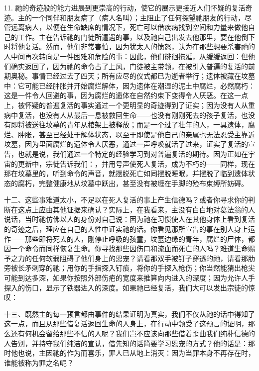 11. 祂的奇迹般的能力进展到更崇高的行动，使它的展示更接近人们怀疑的复活奇迹。主的一个同伴和朋友病了（病人名叫）；主阻止了任何探望祂朋友的行动，尽管远离病人，以便在生命缺席的情况下，死亡可以借疾病找到空间和力量来做他自己的工作。主在告诉祂的门徒所遭遇的事，以及祂自己出发去他那里，要在他倒下时将他复活。然而，他们非常害怕，因为犹太人的愤怒，认为在那些想要杀害祂的人中间再次转向是一件困难和危险的事：因此，他们徘徊拖延，从缓缓返回：但他们确实返回了，因为祂的命令占了上风，门徒被主带领，在被引入普遍的复活的前期奥秘。事情已经过去了四天；所有应尽的仪式都已为逝者举行；遗体被藏在坟墓中：它可能已经肿胀并开始腐烂解体，因为遗体在潮湿的泥土中腐烂，必然腐朽：这是一件令人回避的事，因为腐烂的遗体在自然约束下变得令人厌恶。在这一点上，被怀疑的普遍复活的事实通过一个更明显的奇迹得到了证实；因为没有人从重病中复活，也没有人从最后一息被救回生命——也没有刚刚死去的孩子复活，也没有即将被送往坟墓的青年从棺架上被释放；而是一个过了壮年的人，一具遗体，腐烂、肿胀，甚至已经处于解体状态，以至于即使是他自己的亲属也无法忍受主靠近坟墓，因为里面腐烂的遗体令人厌恶，通过一声呼唤就活了过来，证实了复活的宣告，也就是说，我们通过一个特定的经验学习到对普遍复活的期待。因为正如在宇宙的更新中，宗徒告诉我们：，并用号声使死人复活，成为不朽的——同样，现在那在坟墓里的，听到命令的声音，就摆脱死亡如同摆脱睡眠，并摆脱了临到遗体状态的腐朽，完整健康地从坟墓中跃出，甚至没有被缠在手脚的殓布束缚所妨碍。\par

十二、这些事难道太小，不足以在死人复活的事上产生信德吗？或者你寻求你的判断在这点上应由其他证据来确认？实际上，在我看来，主没有白白地对葛法翁的人说话，当时祂仿佛以人的身份对自己说：因为祂在习惯使人在其他身体上看到复活的奇迹之后，理应在自己的人性中证实祂的话。你看见那所宣告的事在别人身上运作——那些即将死去的人，刚停止呼吸的孩童，坟墓边缘的青年，腐烂的尸体，都因一个命令而同样恢复生命。你寻找那些因伤口和流血而死亡的人吗？难道生命赐予之力的任何软弱阻碍了他们身上的恩宠？请看那双手被钉子穿透的祂，请看那肋旁被长矛刺穿的祂；用你的手指探入钉痕，将你的手探入枪伤；你当然能猜出枪尖可能到达多深，如果你按照外部伤疤的宽度来推算向内进入的深度；因为允许人手探入的伤口，显示了铁器进入的深度。如果祂已经复活，我们大可以发出宗徒的惊叹：\par

十三、既然主的每一预言都由事件的结果证明为真实，我们不仅从祂的话中得知了这一点，而且从那些借复活返回生命的人身上，在行动中领受了这预言的证明，那么还有何机会留给那些不信的人呢？我们岂不应该向那些借着歪曲我们纯朴信德的人告别，并持守我们纯洁的宣认，借先知的话简要学习恩宠的方式？他的话是：那时他也说，主因祂的作为而喜乐，罪人已从地上消灭：因为当罪本身不再存在时，谁能被称为罪之名呢？\par

